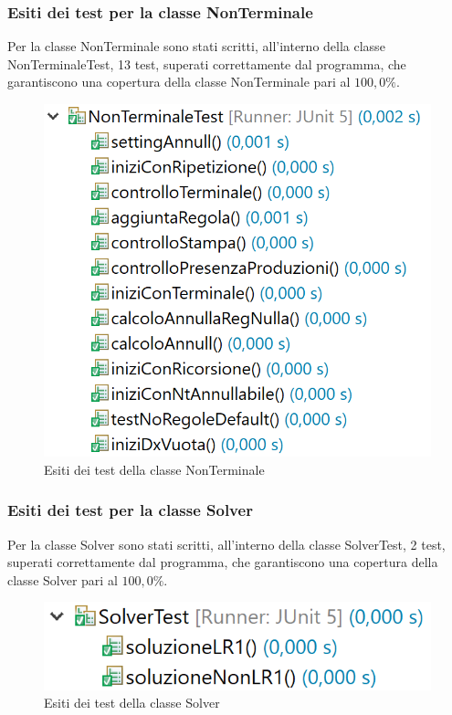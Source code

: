 \documentclass[12pt]{article}
\begin{document}
\subsubsection{Esiti dei test per la classe NonTerminale}
Per la classe NonTerminale sono stati scritti, all'interno della classe NonTerminaleTest, 13 test, superati correttamente dal programma, che garantiscono una copertura della classe NonTerminale pari al $100,0\%$.
\begin{figure}[h]
\centering
\includegraphics[scale=0.4]{immagini/esitiNonTerminaleTest.png}
\caption{Esiti dei test della classe NonTerminale}
\end{figure}
\pagebreak
\subsubsection{Esiti dei test per la classe Solver}
Per la classe Solver sono stati scritti, all'interno della classe SolverTest, 2 test, superati correttamente dal programma, che garantiscono una copertura della classe Solver pari al $100,0\%$.
\begin{figure}[h]
\centering
\includegraphics[scale=0.4]{immagini/esitiSolverTest.png}
\caption{Esiti dei test della classe Solver}
\end{figure}
\end{document}
